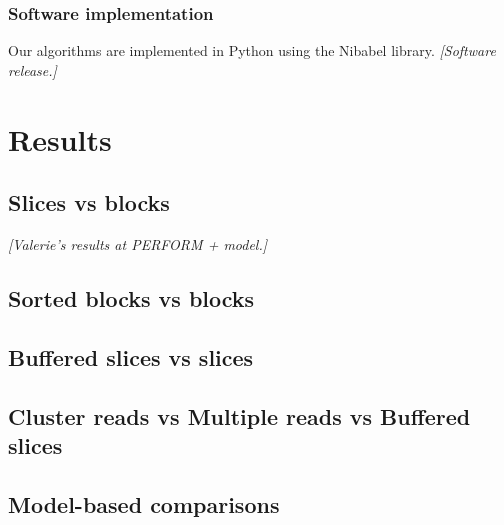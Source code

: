 \documentclass[10pt, conference, compsocconf]{IEEEtran}
\newcommand{\todo}[1]{
  \color{red}\emph{[#1]}
  \color{black}
}
\begin{document}
\subsubsection{Software implementation}

Our algorithms are implemented in Python using the Nibabel
library. \todo{Software release.}

\section{Results}

\subsection{Slices vs blocks}

\todo{Valerie's results at PERFORM + model.}

\subsection{Sorted blocks vs blocks}

\subsection{Buffered slices vs slices}


\subsection{Cluster reads vs Multiple reads vs Buffered slices}

\subsection{Model-based comparisons}
\end{document}
